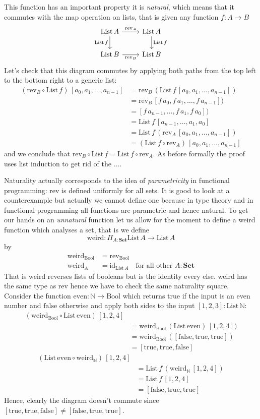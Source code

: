 \documentclass{article}
\newcommand{\Set}{\mathbf{Set}}
\newcommand{\Bool}{\mathrm{Bool}}
\newcommand{\true}{\mathrm{true}}
\newcommand{\false}{\mathrm{false}}
\newcommand{\id}{\mathrm{id}}
\newcommand{\Nat}{\mathbb{N}}
\newcommand{\List}{\mathrm{List}}
\newcommand{\rev}{\mathrm{rev}}
\newcommand{\weird}{\mathrm{weird}}
\newcommand{\even}{\mathrm{even}}
\begin{document}
This function has an important property it is \emph{natural}, which means that it commutes with the map operation on lists, that is given any function 
$f : A \to B$
\[\begin{tikzcd}
\List\,A \arrow[r,"\rev_A"] \arrow[d,"\List\,f" left] & \List\,A \arrow[d,"\List\,f"]\\
\List\,B \arrow[r,"\rev_B" below] & \List\,B
\end{tikzcd}
\]
Let's check that this diagram commutes by applying both paths from the top left to the bottom right to a generic list:
\begin{align*}
(\rev_B \circ \List\,f)\, [a_0,a_1,\dots,a_{n-1}] 
& = \rev_B\,(\List\,f\, [a_0,a_1,\dots,a_{n-1}]) \\
& = \rev_B\,[f\,a_0,f\,a_1,\dots,f\,a_{n-1}]) \\
& = [f\,a_{n-1}, \dots,f\,a_1,f\,a_0]) \\
& = \List\,f\, [a_{n-1},\dots,a_1,a_0]\\
& = \List\,f\,(\rev_A\, [a_0,a_1,\dots,a_{n-1}])\\
& = (\List\,f\circ \rev_A)\, [a_0,a_1,\dots,a_{n-1}]
\end{align*}
and we conclude that $\rev_B \circ \List\,f = \List\,f\circ \rev_A$. As before formally the proof uses list induction to get rid of the $\dots$.

Naturality actually corresponds to the idea of \emph{parametricity} in functional programming: $\rev$ is defined uniformly for all sets. It is good to look at a counterexample but actually we cannot define one because in type theory and in functional programming all functions are parametric and hence natural. To get our hands on an \emph{unnatural} function let us allow for the moment to define a weird function which analyses a set, that is we define
\[ \weird : \Pi_{A:\Set} \List\,A \to \List\,A\]
by 
\begin{align*}
  \weird_\Bool & = \rev_\Bool \\
  \weird_A & = \id_{\List\,A} \quad\mbox{for all other $A:\Set$}
\end{align*}
That is weird reverses lists of booleans but is the identity every else. weird has the same type as $\rev$ hence we have to check the same naturality square. Consider the function $\even : \Nat \to \Bool$ which returns $\true$ if the input is an even number and $\false$ otherwise and apply both sides to the input $[1,2,3]:\List\,\Nat$:
\begin{align*}
(\weird_\Bool \circ \List\,\even)\,[1,2,4] \\
& = \weird_\Bool\,(\List\,\even)\,[1,2,4])  \\
& = \weird_\Bool\,([\false,\true,\true])  \\
& = [\true,\true,\false]
\end{align*}
\begin{align*}
(\List\,\even\circ \weird_\Nat)\, [1,2,4] \\
& = \List\,f\,(\weird_\Nat\, [1,2,4]) \\
& = \List\,f\,[1,2,4] \\
& = [\false,\true,\true]
\end{align*}
Hence, clearly the diagram doesn't commute since $[\true,\true,\false] \not= [\false,\true,\true]$.
\end{document}
